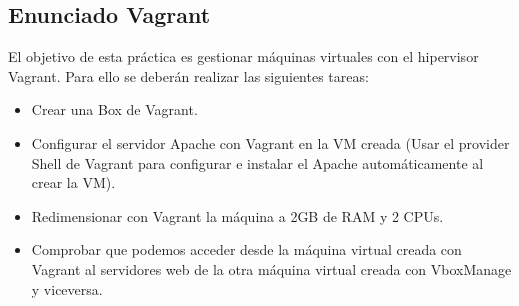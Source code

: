 \begin{comment}
\subsection{Enunciado libvirt/kvm}
//TODO: Cambiar algunas cosas que son relativas a VirtualBox y no a esto
\begin{ejer}
    \par El objetivo de esta práctica es gestionar máquinas virtuales con el hipervisor libvirt/kvm. 
	Para ello se deberán realizar las siguientes tareas:
	\begin{itemize}
		\item Crear una VM mediante libvirt/kvm, Vboxmanage: 
		\begin{itemize}
			\item 1GB de ram, 2 cpus, 8 GB de disco duro SATA.
		\end{itemize}
		\item Instalar ubuntu-server en la máquina. Instalarle el servicio nginx a la máquina. 
		\item Instalar Ubuntu-desktop en otra máquina. Instalar un navegador web. 
		\item Comprobar que podemos acceder al servidor web desde un navegador en el host 
		\item Comprobar que podemos acceder al servidor web desde un navegador en la máquina guest desktop.
		\item Transformar el disco de la máquina de formato .vdi a formato qcow2. 
		\item Redimensionar la maquina original servidor de libvirt/kvm con la utilidad \textbf{Vboxmanage:} 2GB de RAM y 10GB disco duro. 
		\item Destruir las máquinas virtuales (utilizando comandos).
	\end{itemize}
\end{ejer}


\end{comment}

\subsection{Enunciado Vagrant}
\begin{ejer}
    \par El objetivo de esta práctica es gestionar máquinas virtuales con el hipervisor Vagrant. 
	Para ello se deberán realizar las siguientes tareas:
	\begin{itemize}
		\item Crear una Box de Vagrant. 
		\item Configurar el servidor Apache con Vagrant en la VM creada (Usar el provider Shell de Vagrant para configurar e instalar el Apache automáticamente al crear la VM).
		\item Redimensionar con Vagrant la máquina a 2GB de RAM y 2 CPUs.
		\item Comprobar que podemos acceder desde la máquina virtual creada con Vagrant al servidores web de la otra máquina virtual creada con VboxManage y viceversa.
	\end{itemize}
\end{ejer}

